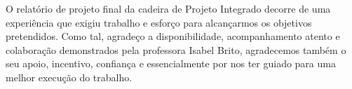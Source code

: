 \agradecimentos

O relatório de projeto final da cadeira de Projeto Integrado decorre de uma experiência que exigiu trabalho e esforço para alcançarmos os objetivos pretendidos. Como tal, agradeço a disponibilidade, acompanhamento atento e
colaboração demonstrados pela professora Isabel Brito, agradecemos também o seu apoio, incentivo, confiança e essencialmente por nos ter guiado para uma melhor execução do trabalho.


